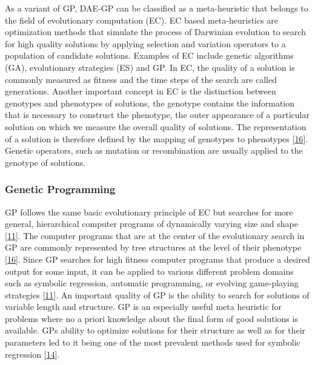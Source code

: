 \documentclass[
  11pt,
]{article}
\begin{document}
As a variant of GP, DAE-GP can be classified as a meta-heuristic that belongs to the field of evolutionary computation (EC).
EC based meta-heuristics are optimization methods that simulate the process of Darwinian evolution to search for high quality solutions by applying selection and variation operators to a population of candidate solutions.
Examples of EC include genetic algorithms (GA), evolutionary strategies (ES) and GP.
In EC, the quality of a solution is commonly measured as fitness and the time steps of the search are called generations.
Another important concept in EC is the distinction between genotypes and phenotypes of solutions, the genotype contains the information that is necessary to construct the phenotype, the outer appearance of a particular solution on which we measure the overall quality of solutions.
The representation of a solution is therefore defined by the mapping of genotypes to phenotypes {[}\protect\hyperlink{ref-design_of_modern_heuristics}{16}{]}.
Genetic operators, such as mutation or recombination are usually applied to the genotype of solutions.

\hypertarget{genetic-programming}{%
\subsubsection{Genetic Programming}\label{genetic-programming}}

GP follows the same basic evolutionary principle of EC but searches for more general, hierarchical computer programs of dynamically varying size and shape {[}\protect\hyperlink{ref-Koza1993GeneticP}{11}{]}.
The computer programs that are at the center of the evolutionary search in GP are commonly represented by tree structures at the level of their phenotype {[}\protect\hyperlink{ref-design_of_modern_heuristics}{16}{]}.
Since GP searches for high fitness computer programs that produce a desired output for some input, it can be applied to various different problem domains such as symbolic regression, automatic programming, or evolving game-playing strategies {[}\protect\hyperlink{ref-Koza1993GeneticP}{11}{]}.
An important quality of GP is the ability to search for solutions of variable length and structure.
GP is an especially useful meta heuristic for problems where no a priori knowledge about the final form of good solutions is available.
GPs ability to optimize solutions for their structure as well as for their parameters led to it being one of the most prevalent methods used for symbolic regression {[}\protect\hyperlink{ref-10.1007ux2f978-3-540-24621-3_22}{14}{]}.
\end{document}
